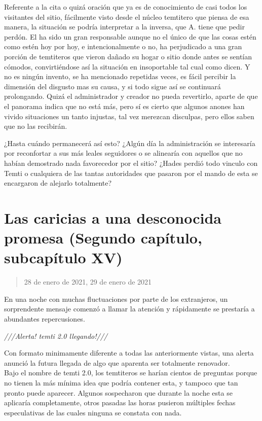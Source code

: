 \documentclass[
  spanish,
]{book}
\begin{document}
Referente a la cita o quizá oración que ya es de conocimiento de casi todos los visitantes del sitio, fácilmente visto desde el núcleo temtitero que piensa de esa manera, la situación se podría interpretar a la inversa, que A. tiene que pedir perdón. El ha sido un gran responsable aunque no el único de que las cosas estén como estén hoy por hoy, e intencionalmente o no, ha perjudicado a una gran porción de temtiteros que vieron dañado su hogar o sitio donde antes se sentían cómodos, convirtiéndose así la situación en insoportable tal cual como dicen. Y no es ningún invento, se ha mencionado repetidas veces, es fácil percibir la dimensión del disgusto mas su causa, y si todo sigue así se continuará prolongando. Quizá el administrador y creador no pueda revertirlo, aparte de que el panorama indica que no está más, pero sí es cierto que algunos anones han vivido situaciones un tanto injustas, tal vez merezcan disculpas, pero ellos saben que no las recibirán.

¿Hasta cuándo permanecerá así esto? ¿Algún día la administración se interesaría por reconfortar a sus más leales seguidores o se alinearía con aquellos que no habían demostrado nada favorecedor por el sitio? ¿Hades perdió todo vinculo con Temti o cualquiera de las tantas autoridades que pasaron por el mando de esta se encargaron de alejarlo totalmente?

\hypertarget{las-caricias-a-una-desconocida-promesa-segundo-capuxedtulo-subcapuxedtulo-xv}{%
\section{Las caricias a una desconocida promesa (Segundo capítulo, subcapítulo XV)}\label{las-caricias-a-una-desconocida-promesa-segundo-capuxedtulo-subcapuxedtulo-xv}}

\begin{quote}
28 de enero de 2021, 29 de enero de 2021
\end{quote}

En una noche con muchas fluctuaciones por parte de los extranjeros, un sorprendente mensaje comenzó a llamar la atención y rápidamente se prestaría a abundantes repercusiones.

\emph{///Alerta! temti 2.0 llegando!///}

Con formato minimamente diferente a todas las anteriormente vistas, una alerta anunció la futura llegada de algo que aparenta ser totalmente renovador.\\
Bajo el nombre de temti 2.0, los temtiteros se harían cientos de preguntas porque no tienen la más mínima idea que podría contener esta, y tampoco que tan pronto puede aparecer. Algunos sospecharon que durante la noche esta se aplicaría completamente, otros pasadas las horas pusieron múltiples fechas especulativas de las cuales ninguna se constata con nada.
\end{document}

